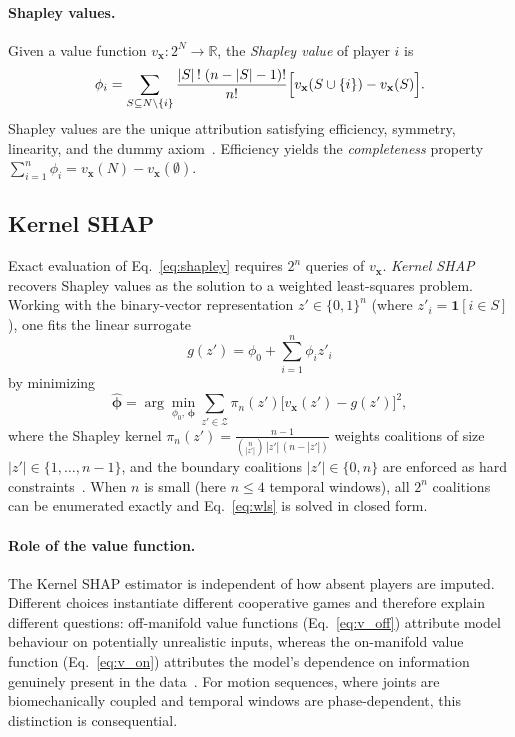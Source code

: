 \paragraph{Shapley values.}
Given a value function $v_\mathbf{x} : 2^N \to \mathbb{R}$, the
\emph{Shapley value} of player $i$ is~\citep{shapley1953value}
\begin{equation}
  \phi_i
  = \sum_{S \subseteq N \setminus \{i\}}
    \frac{|S|\,!\;(n - |S| - 1)!}{n!}
    \Bigl[v_\mathbf{x}(S \cup \{i\}) - v_\mathbf{x}(S)\Bigr].
  \label{eq:shapley}
\end{equation}
Shapley values are the unique attribution satisfying efficiency, symmetry,
linearity, and the dummy axiom~\citep{shapley1953value}.  Efficiency yields
the \emph{completeness} property
$\sum_{i=1}^n \phi_i = v_\mathbf{x}(N) - v_\mathbf{x}(\emptyset)$.

\subsection{Kernel SHAP}
\label{sec:kernelshap}

Exact evaluation of Eq.~\eqref{eq:shapley} requires $2^n$ queries of
$v_\mathbf{x}$.  \emph{Kernel SHAP}~\citep{lundberg2017unified} recovers
Shapley values as the solution to a weighted least-squares problem.
Working with the binary-vector representation $z' \in \{0,1\}^n$ (where
$z'_i = \mathbf{1}[i \in S]$), one fits the linear surrogate
\begin{equation}
  g(z') = \phi_0 + \sum_{i=1}^{n} \phi_i z'_i
  \label{eq:surrogate}
\end{equation}
by minimizing
\begin{equation}
  \hat{\boldsymbol{\phi}}
  = \arg\min_{\phi_0,\,\boldsymbol{\phi}}
    \sum_{z' \in \mathcal{Z}}
    \pi_n(z')\bigl[v_\mathbf{x}(z') - g(z')\bigr]^2,
  \label{eq:wls}
\end{equation}
where the Shapley kernel
$\pi_n(z') = \frac{n - 1}{\binom{n}{|z'|}\,|z'|\,(n - |z'|)}$
weights coalitions of size $|z'| \in \{1, \ldots, n-1\}$, and the boundary
coalitions $|z'| \in \{0, n\}$ are enforced as hard
constraints~\citep{lundberg2017unified}.
When $n$ is small (here $n \le 4$ temporal windows), all $2^n$ coalitions can
be enumerated exactly and Eq.~\eqref{eq:wls} is solved in closed form.

\paragraph{Role of the value function.}
The Kernel SHAP estimator is independent of how absent players are imputed.
Different choices instantiate different cooperative games and therefore
explain different questions: off-manifold value functions (Eq.~\ref{eq:v_off})
attribute model behaviour on potentially unrealistic inputs, whereas the
on-manifold value function (Eq.~\ref{eq:v_on}) attributes the model's
dependence on information genuinely present in the data~\citep{frye2021shapley}.
For motion sequences, where joints are biomechanically coupled and temporal
windows are phase-dependent, this distinction is consequential.

